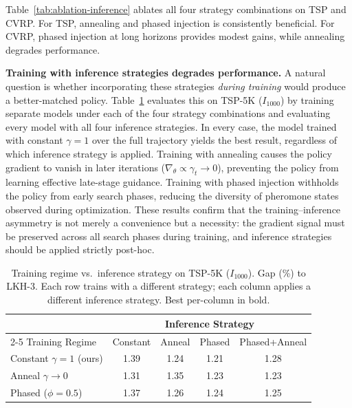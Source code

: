 \documentclass[sigconf,review]{acmart}
\begin{document}
Table~\ref{tab:ablation-inference} ablates all four strategy combinations on TSP and CVRP.
For TSP, annealing and phased injection is consistently beneficial.
For CVRP, phased injection at long horizons provides modest gains, while annealing degrades performance.

\textbf{Training with inference strategies degrades performance.}
A natural question is whether incorporating these strategies \emph{during training} would produce a better-matched policy.
Table~\ref{tab:train-strategy} evaluates this on TSP-5K ($I_{1000}$) by training separate models under each of the four strategy combinations and evaluating every model with all four inference strategies.
In every case, the model trained with constant $\gamma{=}1$ over the full trajectory yields the best result, regardless of which inference strategy is applied.
Training with annealing causes the policy gradient to vanish in later iterations ($\nabla_\theta \propto \gamma_t \to 0$), preventing the policy from learning effective late-stage guidance.
Training with phased injection withholds the policy from early search phases, reducing the diversity of pheromone states observed during optimization.
These results confirm that the training--inference asymmetry is not merely a convenience but a necessity: the gradient signal must be preserved across all search phases during training, and inference strategies should be applied strictly post-hoc.

\begin{table}[h]
\centering
\caption{Training regime vs.\ inference strategy on TSP-5K ($I_{1000}$). Gap (\%) to LKH-3. Each row trains with a different strategy; each column applies a different inference strategy. Best per-column in bold.}
\label{tab:train-strategy}
\small
\begin{tabular}{lcccc}
\toprule
& \multicolumn{4}{c}{Inference Strategy} \\
\cmidrule(lr){2-5}
Training Regime & Constant & Anneal & Phased & Phased+Anneal \\
\midrule
Constant $\gamma{=}1$ (ours)               & 1.39 & 1.24 & 1.21 & 1.28 \\
Anneal $\gamma{\to}0$                       & 1.31 & 1.35 & 1.23 & 1.23 \\
Phased ($\phi{=}0.5$)                       & 1.37 & 1.26 & 1.24 & 1.25 \\
\bottomrule
\end{tabular}
\end{table}

\end{document}
